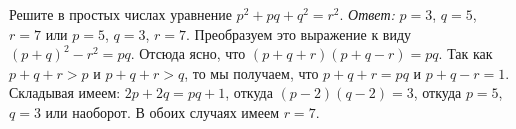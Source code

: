\problem
Решите в простых числах уравнение $p^2 + p q + q^2 = r^2$.
\solution
\emph{Ответ:} $p = 3$, $q = 5$, $r = 7$ или $p = 5$, $q = 3$, $r = 7$.
Преобразуем это выражение к виду $(p + q)^2 - r^2 = p q$.
Отсюда ясно, что $(p + q + r) (p + q - r) = p q$.
Так как $p + q + r > p$ и $p + q + r > q$, то мы получаем, что $p + q + r = p q$
и $p + q - r = 1$.
Складывая имеем: $2 p + 2 q = p q + 1$, откуда $(p - 2) (q - 2) = 3$, откуда
$p = 5$, $q = 3$ или наоборот.
В обоих случаях имеем $r = 7$.
\endproblem
